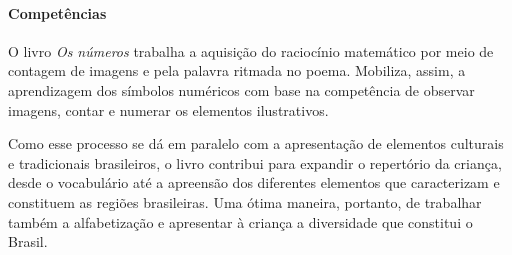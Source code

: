 \documentclass[11pt]{extarticle}
\begin{document}
\paragraph{Competências}
O livro \textit{Os números} trabalha a aquisição do raciocínio matemático por meio de contagem de imagens e pela palavra ritmada no poema. Mobiliza, assim, a aprendizagem dos símbolos numéricos com base na competência de observar imagens, contar e numerar os elementos ilustrativos.

Como esse processo se dá em paralelo com a apresentação de elementos culturais e tradicionais brasileiros, o livro contribui para expandir o repertório da criança, desde o vocabulário até a apreensão dos diferentes elementos que caracterizam e constituem as regiões brasileiras. Uma ótima maneira, portanto, de trabalhar também a alfabetização e apresentar à criança a diversidade que constitui o Brasil.


\reversemarginpar
\marginparwidth=5cm

\end{document}

